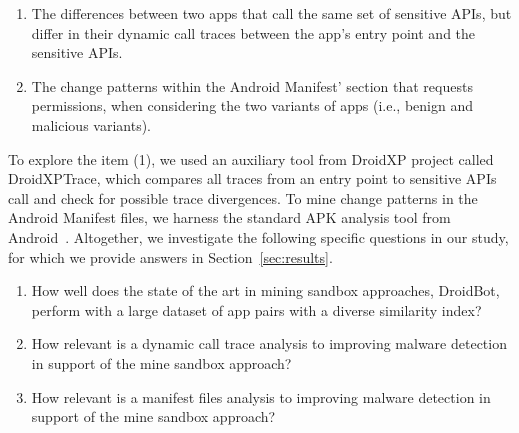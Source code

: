 \begin{enumerate}
    \item The differences between two apps that call the same set of sensitive APIs, but differ in their dynamic call traces between the app's entry point and the sensitive APIs.
    \item The {\color{blue}change patterns} within the Android Manifest' section that requests permissions, when considering the two variants of apps (i.e., benign and malicious variants).
\end{enumerate}

To explore the item (1), we used an auxiliary tool from DroidXP project called DroidXPTrace, which compares all traces from an entry point to sensitive APIs call and check for possible trace divergences. To {\color{blue}mine change patterns} in the Android Manifest files, we harness the standard APK analysis tool from Android~\cite{au2011short}. Altogether, we investigate the following specific questions in our study, for which we provide answers in Section~\ref{sec:results}.


\begin{enumerate}[(RQ1)]
 \item How well does the state of the art in mining sandbox approaches, DroidBot, perform with a large dataset of app pairs with a diverse similarity index?
 \item How relevant is a dynamic call trace analysis to improving malware detection in support of the mine sandbox approach?
 \item How relevant is a manifest files analysis to improving malware detection in support of the mine sandbox approach?
\end{enumerate}
 

